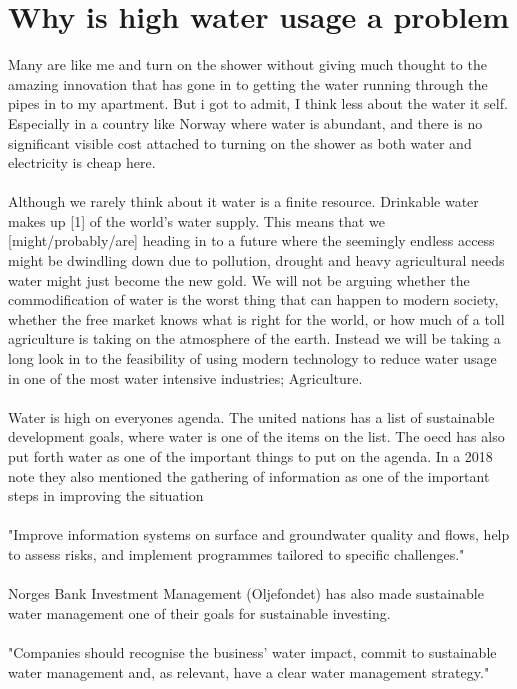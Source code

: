 \documentclass[]{uiophd}
\begin{document}
\section{Why is high water usage a problem}
Many are like me and turn on the shower without giving much thought to the amazing innovation that has gone in to getting the water running through the pipes in to my apartment. But i got to admit, I think less about the water it self. Especially in a country like Norway where water is abundant, and there is no significant visible cost attached to turning on the shower as both water and electricity is cheap here.
\\\\
Although we rarely think about it water is a finite resource. Drinkable water makes up [1] of the world's water supply. This means that we [might/probably/are] heading in to a future where the seemingly endless access might be dwindling down due to pollution, drought and heavy agricultural needs water might just become the new gold. We will not be arguing whether the commodification of water is the worst thing that can happen to modern society, whether the free market knows what is right for the world, or how much of a toll agriculture is taking on the atmosphere of the earth. Instead we will be taking a long look in to the feasibility of using modern technology to reduce water usage in one of the most water intensive industries; Agriculture.
\\\\
Water is high on everyones agenda. The united nations has a list of sustainable development goals, where water is one of the items on the list. The oecd has also put forth water as one of the important things to put on the agenda. In a 2018 note they also mentioned the gathering of information as one of the important steps in improving the situation 
\\\\
"Improve information systems on surface and groundwater quality and flows, help to assess risks, and implement programmes tailored to specific challenges."
\\\\
Norges Bank Investment Management (Oljefondet) has also made sustainable water management one of their goals for sustainable investing. 
\\\\
"Companies should recognise the business’
water impact, commit to sustainable water
management and, as relevant, have a clear
water management strategy."
\end{document}
